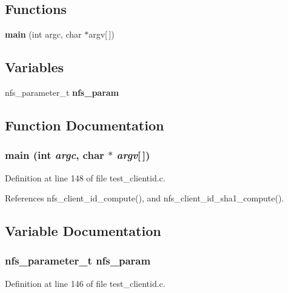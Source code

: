\subsection*{Functions}
\begin{CompactItemize}
\item 
{\bf main} (int argc, char $\ast$argv[$\,$])
\end{CompactItemize}
\subsection*{Variables}
\begin{CompactItemize}
\item 
nfs\_\-parameter\_\-t {\bf nfs\_\-param}
\end{CompactItemize}


\subsection{Function Documentation}
\subsubsection{\setlength{\rightskip}{0pt plus 5cm}main (int {\em argc}, char $\ast$ {\em argv}[$\,$])}\label{test__clientid_8c_a1}




Definition at line 148 of file test\_\-clientid.c.

References nfs\_\-client\_\-id\_\-compute(), and nfs\_\-client\_\-id\_\-sha1\_\-compute().

\subsection{Variable Documentation}
\subsubsection{\setlength{\rightskip}{0pt plus 5cm}nfs\_\-parameter\_\-t {\bf nfs\_\-param}}\label{test__clientid_8c_a0}




Definition at line 146 of file test\_\-clientid.c.